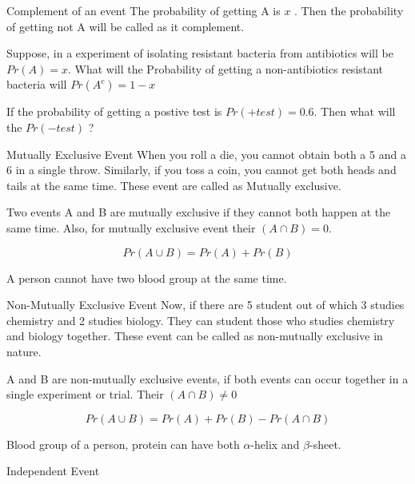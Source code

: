 \documentclass{beamer}
\begin{document}
    


\begin{frame}{Complement of an event}
    The probability of getting A is $x$ . Then the probability of getting not A will be called as it complement.
    \begin{example}
        Suppose, in a experiment of isolating resistant bacteria from antibiotics will be $Pr(A)=x$. What will the Probability of getting a non-antibiotics resistant bacteria will $Pr(A^c)=1-x$
    \end{example}\vspace{0.5cm}
    If the probability of getting a postive test is $Pr(+test)= 0.6$. Then what will the $Pr(-test)$ ?
\end{frame}
\begin{frame}{Mutually Exclusive Event}
When you roll a die, you cannot obtain both a 5 and a 6 in a single throw. Similarly, if you toss a coin, you cannot get both heads and tails at the same time. These event are called as Mutually exclusive. \vspace{0.3cm}   \begin{definition}
        Two events A and B are mutually exclusive if they cannot both happen at the same time. Also, for mutually exclusive event their $(A\cap B)=0$.
    \end{definition}
    \begin{equation}
        Pr(A \cup B)=Pr(A)+Pr(B)
    \end{equation}
    \begin{example}
        A person cannot have two blood group at the same time. 
    \end{example}

\end{frame}
\begin{frame}{Non-Mutually Exclusive Event}
Now, if there are 5 student out of which 3 studies chemistry and 2 studies biology. They can student those who studies chemistry and biology together. These event can be called as non-mutually exclusive in nature. \vspace{0.3cm}
\begin{definition}
    A and B are non-mutually exclusive events, if both events can occur together in a single experiment or trial. Their $(A\cap B)\neq 0$
\end{definition}
\begin{equation}
            Pr(A \cup B)=Pr(A)+Pr(B)-Pr(A\cap B)
\end{equation}
    \begin{example}
        Blood group of a person, protein can have both $\alpha$-helix and $\beta$-sheet.
    \end{example}
\end{frame}
\begin{frame}{Independent Event}
    
\end{frame}
\end{document}

